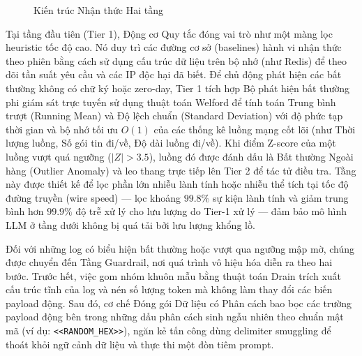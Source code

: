 \documentclass[12pt,a4paper]{article}
\begin{document}
\begin{figure}[!htbp]
{
    }
    \caption{Kiến trúc Nhận thức Hai tầng}
    \label{fig:architecture}
\end{figure}

Tại tầng đầu tiên (Tier 1), Động cơ Quy tắc đóng vai trò như một màng lọc heuristic tốc độ cao. Nó duy trì các đường cơ sở (baselines) hành vi nhận thức theo phiên bằng cách sử dụng cấu trúc dữ liệu trên bộ nhớ (như Redis) để theo dõi tần suất yêu cầu và các IP độc hại đã biết. Để chủ động phát hiện các bất thường không có chữ ký hoặc zero-day, Tier 1 tích hợp Bộ phát hiện bất thường phi giám sát trực tuyến sử dụng thuật toán Welford để tính toán Trung bình trượt (Running Mean) và Độ lệch chuẩn (Standard Deviation) với độ phức tạp thời gian và bộ nhớ tối ưu $O(1)$ của các thống kê luồng mạng cốt lõi (như Thời lượng luồng, Số gói tin đi/về, Độ dài luồng đi/về). Khi điểm Z-score của một luồng vượt quá ngưỡng ($|Z| > 3.5$), luồng đó được đánh dấu là Bất thường Ngoài hàng (Outlier Anomaly) và leo thang trực tiếp lên Tier 2 để tác tử điều tra. Tầng này được thiết kế để lọc phần lớn nhiễu lành tính hoặc nhiễu thể tích tại tốc độ đường truyền (wire speed) --- lọc khoảng $99.8\%$ sự kiện lành tính và giảm trung bình hơn $99.9\%$ độ trễ xử lý cho lưu lượng do Tier-1 xử lý --- đảm bảo mô hình LLM ở tầng dưới không bị quá tải bởi lưu lượng khổng lồ.

Đối với những log có biểu hiện bất thường hoặc vượt qua ngưỡng mập mờ, chúng được chuyển đến Tầng Guardrail, nơi quá trình vô hiệu hóa diễn ra theo hai bước. Trước hết, việc gom nhóm khuôn mẫu bằng thuật toán Drain trích xuất cấu trúc tĩnh của log và nén số lượng token mà không làm thay đổi các biến payload động. Sau đó, cơ chế Đóng gói Dữ liệu có Phân cách bao bọc các trường payload động bên trong những dấu phân cách sinh ngẫu nhiên theo chuẩn mật mã (ví dụ: \verb|<<RANDOM_HEX>>|), ngăn kẻ tấn công dùng delimiter smuggling để thoát khỏi ngữ cảnh dữ liệu và thực thi một đòn tiêm prompt.
\end{document}
